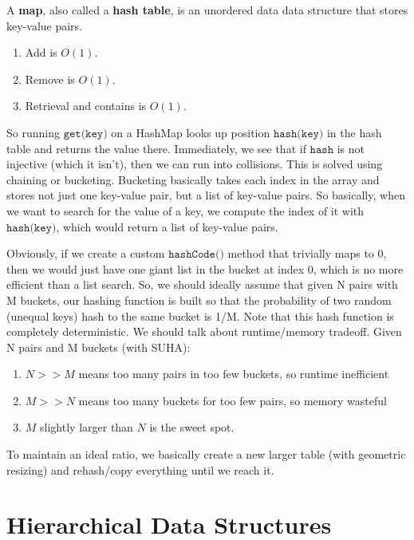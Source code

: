 \documentclass{article}
\begin{document}
    \begin{definition}[Maps]
      A \textbf{map}, also called a \textbf{hash table}, is an unordered data data structure that stores key-value pairs.   
      \begin{enumerate}
        \item Add is $O(1)$. 
        \item Remove is $O(1)$. 
        \item Retrieval and contains is $O(1)$. 
      \end{enumerate}
    \end{definition}

    So running $\texttt{get(key)}$ on a HashMap looks up position $\texttt{hash(key)}$ in the hash table and returns the value there. Immediately, we see that if $\texttt{hash}$ is not injective (which it isn't), then we can run into collisions. This is solved using chaining or bucketing. Bucketing basically takes each index in the array and stores not just one key-value pair, but a list of key-value pairs. So basically, when we want to search for the value of a key, we compute the index of it with $\texttt{hash(key)}$, which would return a list of key-value pairs. 

    Obviously, if we create a custom $\texttt{hashCode()}$ method that trivially maps to 0, then we would just have one giant list in the bucket at index 0, which is no more efficient than a list search. So, we should ideally assume that given N pairs with M buckets, our hashing function is built so that the probability of two random (unequal keys) hash to the same bucket is 1/M. Note that this hash function is completely deterministic. We should talk about runtime/memory tradeoff. Given N pairs and M buckets (with SUHA): 
    \begin{enumerate}
        \item $N >> M$ means too many pairs in too few buckets, so runtime inefficient 
        \item $M >> N$ means too many buckets for too few pairs, so memory wasteful 
        \item $M$ slightly larger than $N$ is the sweet spot.
    \end{enumerate}
    To maintain an ideal ratio, we basically create a new larger table (with geometric resizing) and rehash/copy everything until we reach it.

\section{Hierarchical Data Structures} 
\end{document}
